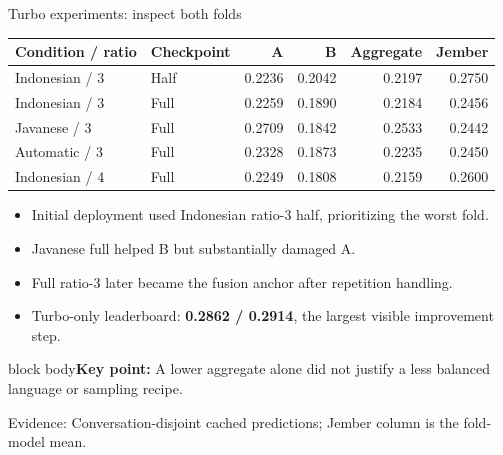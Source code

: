 \documentclass[aspectratio=169,11pt]{beamer}
\newcommand{\takeaway}[1]{\vfill\begin{beamercolorbox}[sep=2mm,wd=\linewidth]{block body}\small\textbf{Key point:} #1\end{beamercolorbox}}
\newcommand{\evidence}[1]{\vspace{1mm}\par{\tiny\color{slate}Evidence: #1\par}}
\begin{document}
\begin{frame}{Turbo experiments: inspect both folds}
\centering\small
\begin{tabular}{@{}llrrrr@{}}\toprule
\textbf{Condition / ratio}&\textbf{Checkpoint}&\textbf{A}&\textbf{B}&\textbf{Aggregate}&\textbf{Jember}\\\midrule
Indonesian / 3&Half&0.2236&0.2042&0.2197&0.2750\\
Indonesian / 3&Full&0.2259&0.1890&0.2184&0.2456\\
Javanese / 3&Full&0.2709&0.1842&0.2533&0.2442\\
Automatic / 3&Full&0.2328&0.1873&0.2235&0.2450\\
Indonesian / 4&Full&0.2249&0.1808&0.2159&0.2600\\\bottomrule
\end{tabular}
\vspace{4mm}
\begin{itemize}\item Initial deployment used Indonesian ratio-3 half, prioritizing the worst fold.
\item Javanese full helped B but substantially damaged A.
\item Full ratio-3 later became the fusion anchor after repetition handling.
\item Turbo-only leaderboard: \textbf{0.2862 / 0.2914}, the largest visible improvement step.
\end{itemize}
\takeaway{A lower aggregate alone did not justify a less balanced language or sampling recipe.}
\evidence{Conversation-disjoint cached predictions; Jember column is the fold-model mean.}
\end{frame}
\end{document}
